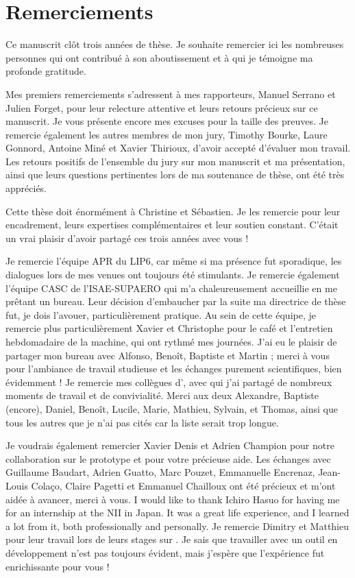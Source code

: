\chapter*{Remerciements}

Ce manuscrit clôt trois années de thèse. Je souhaite remercier ici les nombreuses personnes qui ont
contribué à son aboutissement et à qui je témoigne ma profonde gratitude.

Mes premiers remerciements s'adressent à mes rapporteurs, Manuel Serrano et Julien Forget, pour leur
relecture attentive et leurs retours précieux sur ce manuscrit. Je vous présente encore mes excuses
pour la taille des preuves. Je remercie également les autres membres de mon jury, Timothy Bourke,
Laure Gonnord, Antoine Miné et Xavier Thirioux, d'avoir accepté d'évaluer mon travail. Les retours
positifs de l'ensemble du jury sur mon manuscrit et ma présentation, ainsi que leurs questions
pertinentes lors de ma soutenance de thèse, ont été très appréciés.

Cette thèse doit énormément à Christine et Sébastien. Je les remercie pour leur encadrement, leurs
expertises complémentaires et leur soutien constant. C'était un vrai plaisir d'avoir partagé ces
trois années avec vous !

Je remercie l'équipe APR du LIP6, car même si ma présence fut sporadique, les dialogues lors de mes
venues ont toujours été stimulants. Je remercie également l'équipe CASC de l'ISAE-SUPAERO qui m'a
chaleureusement accueillie en me prêtant un bureau. Leur décision d'embaucher par la suite ma
directrice de thèse fut, je dois l'avouer, particulièrement pratique. Au sein de cette équipe, je
remercie plus particulièrement Xavier et Christophe pour le café et l'entretien hebdomadaire de la
machine, qui ont rythmé mes journées. J'ai eu le plaisir de partager mon bureau avec Alfonso,
Benoît, Baptiste et Martin ; merci à vous pour l'ambiance de travail studieuse et les échanges
purement scientifiques, bien évidemment !
%
Je remercie mes collègues d'\ampere, avec qui j'ai partagé de nombreux moments de travail et de
convivialité. Merci aux deux Alexandre, Baptiste (encore), Daniel, Benoît, Lucile, Marie, Mathieu,
Sylvain, et Thomas, ainsi que tous les autres que je n'ai pas cités car la liste serait trop longue.

Je voudrais également remercier Xavier Denis et Adrien Champion pour notre collaboration sur le
prototype et pour votre précieuse aide. Les échanges avec Guillaume Baudart, Adrien Guatto, Marc
Pouzet, Emmanuelle Encrenaz, Jean-Louis Colaço, Claire Pagetti et Emmanuel Chailloux ont été
précieux et m'ont aidée à avancer, merci à vous.
%
I would like to thank Ichiro Hasuo for having me for an internship at the NII in Japan. It was
a great life experience, and I learned a lot from it, both professionally and personally.
%
Je remercie Dimitry et Matthieu pour leur travail lors de leurs stages sur \GRust. Je sais que
travailler avec un outil en développement n'est pas toujours évident, mais j'espère que l'expérience
fut enrichissante pour vous !

